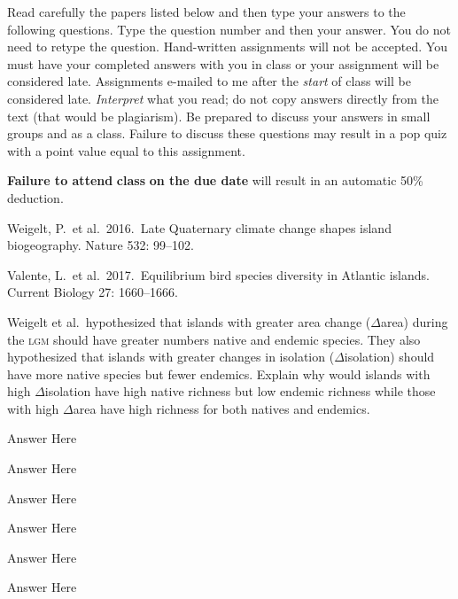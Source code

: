 \documentclass[11pt]{exam}
\begin{document}
Read carefully the papers listed below and then type your answers to the following questions.
Type the question number and then your answer. You do not need to retype the question. Hand-written
assignments will not be accepted. You must have your completed answers
with you in class or your assignment will be considered late. Assignments e-mailed to me after the \emph{start} of class will be
considered late. \emph{Interpret} what you read; do not copy answers directly from the text (that would
be plagiarism). Be prepared to discuss your answers in small groups and as a class. Failure
to discuss these questions may result in a pop quiz with a point value
equal to this assignment.

\textbf{Failure to attend} \textbf{class} \textbf{on the due date} will
result in an automatic 50\% deduction.

\begin{hangparas}{1.5em}{1}
Weigelt, P.~et al.~2016.~Late Quaternary climate change shapes
island biogeography. Nature 532: 99–102.

Valente, L.~et al.~2017.~Equilibrium bird species diversity in
Atlantic islands. Current Biology 27: 1660–1666. 
\end{hangparas}


\begin{questions}

\question[5]
Weigelt et al.~hypothesized that islands with greater area change ($\Delta$area) during the 
\textsc{lgm} should have greater numbers native and endemic species.
They also hypothesized that islands with greater changes in isolation ($\Delta$isolation)
should have more native species but fewer endemics.  Explain why would islands with high $\Delta$isolation have high native richness but low endemic richness while those with high $\Delta$area have high richness for both natives and endemics.

\ifprintanswers
Answer Here
\else{}
\fi

\question[5]
  
\ifprintanswers
Answer Here
\else{}
\fi

\question[5]
  
\ifprintanswers
Answer Here
\else{}
\fi


\question[5]
  
\ifprintanswers
Answer Here
\else{}
\fi


\question[5]
  
\ifprintanswers
Answer Here
\else{}
\fi


\question[5]
  
\ifprintanswers
Answer Here
\else{}
\fi


\end{questions}
\end{document}
